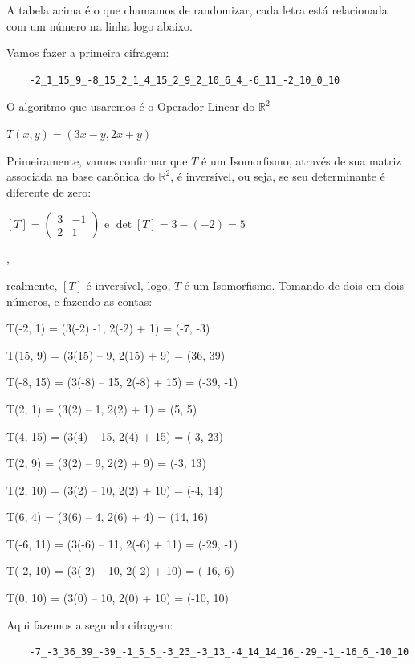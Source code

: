 A tabela acima é o que chamamos de randomizar, cada letra está relacionada com um número na linha logo abaixo.

Vamos fazer a primeira cifragem:

\begin{verbatim}
	-2_1_15_9_-8_15_2_1_4_15_2_9_2_10_6_4_-6_11_-2_10_0_10
\end{verbatim}

O algoritmo que usaremos é o Operador Linear do $\mathbb{R}^2$

\centerline{$T(x, y) = (3x -y, 2x + y)$}

Primeiramente, vamos confirmar que $T$ é um Isomorfismo, através de sua matriz associada na base canônica do $\mathbb{R}^2$, é inversível, ou seja, se seu determinante é diferente de zero:

\centerline{$[T] = \begin{pmatrix} 3 & -1 \\ 2 & 1 \end{pmatrix}$ e $\det[T] = 3 -(-2) = 5$},

\noindent realmente, $[T]$ é inversível, logo, $T$ é um Isomorfismo. Tomando de dois em dois números, e fazendo as contas:

\begin{center}
	T(-2, 1) = (3(-2) -1, 2(-2) + 1) = (-7, -3)

	T(15, 9) = (3(15) – 9, 2(15) + 9) = (36, 39)

	T(-8, 15) = (3(-8) – 15, 2(-8) + 15) = (-39, -1)

	T(2, 1)  = (3(2) – 1, 2(2) + 1) = (5, 5)

	T(4, 15)  = (3(4) – 15, 2(4) + 15) = (-3, 23)

	T(2, 9) = (3(2) – 9, 2(2) + 9) = (-3, 13)

	T(2, 10) = (3(2) – 10, 2(2) + 10) = (-4, 14)

	T(6, 4) = (3(6) – 4, 2(6) + 4) = (14, 16)

	T(-6, 11) = (3(-6) – 11, 2(-6) + 11) = (-29, -1)

	T(-2, 10) = (3(-2) – 10, 2(-2) + 10) = (-16, 6)

	T(0, 10) = (3(0) – 10, 2(0) + 10) = (-10, 10)
\end{center}

Aqui fazemos a segunda cifragem:

\begin{verbatim}
	-7_-3_36_39_-39_-1_5_5_-3_23_-3_13_-4_14_14_16_-29_-1_-16_6_-10_10
\end{verbatim}

